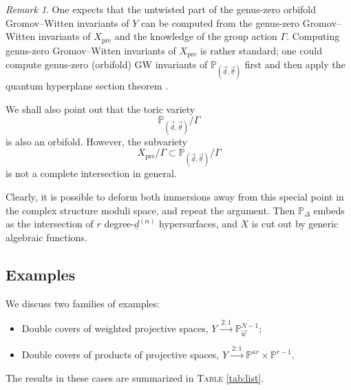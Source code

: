 \documentclass[12pt,a4paper,oneside]{amsart}
\numberwithin{equation}{section}
\theoremstyle{definition}
\theoremstyle{remark}
\newtheorem{rmk}[thm]{Remark}
\newcommand{\cP}{\mathbb{P}}
\newcommand{\Xpre}{X_{\mathrm{pre}}}
\begin{document}
\begin{rmk}
    One expects that the untwisted part of
    the genus-zero orbifold Gromov--Witten invariants of \(Y\)
    can be computed from the genus-zero Gromov--Witten invariants of \(\Xpre\)
    and the knowledge of the group action \(\Gamma\). 
    Computing genus-zero Gromov--Witten invariants of \(\Xpre\)
    is rather standard; one could compute genus-zero (orbifold) GW invariants of 
    \(\mathbb{P}_{(\vec{\underline{d}}, \vec{\underline{\theta}})}\)
    first \cite{Coates_Corti_Iritani_Tseng_2015} and then apply the quantum hyperplane section theorem
    \cite{2010Tseng}.

    We shall also point out that the toric variety 
    \begin{equation*}
        \mathbb{P}_{(\vec{\underline{d}}, \vec{\underline{\theta}})}\slash \Gamma
    \end{equation*}
    is also an orbifold. However, the subvariety
    \begin{equation*}
        \Xpre\slash\Gamma\subset 
        \mathbb{P}_{(\vec{\underline{d}}, \vec{\underline{\theta}})}\slash \Gamma
    \end{equation*}
    is not a complete intersection in general.
\end{rmk} 


Clearly, it is possible to deform both immersions away from this special point in the complex structure moduli space, and repeat the argument. Then $\cP_{\Delta}$ embeds as the intersection of $r$ degree-$\underline{d}^{(\alpha)}$ hypersurfaces, and $X$ is cut out by generic algebraic functions.



\subsection{Examples}
\label{sec:mathEx}

We discuss two families of examples:
\begin{itemize}
	\item Double covers of weighted projective spaces, $Y \xrightarrow{ \ 2:1 \ } \cP_{\vec{w}}^{N-1}$;
	\item Double covers of products of projective spaces, $Y \xrightarrow{ \ 2:1 \ } \cP^{\kappa r}\times \cP^{r-1}$.
\end{itemize}
The results in these cases are summarized in \textsc{Table} \ref{tab:list}. 
\end{document}

